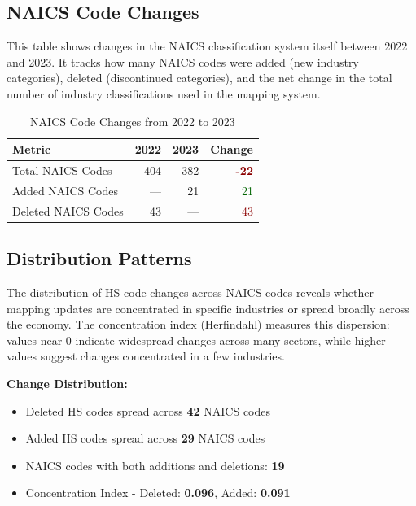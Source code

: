 \documentclass[11pt]{article}
\newcommand{\decrease}[1]{\textcolor{darkred}{\textbf{-#1}}}
\begin{document}
\subsection{NAICS Code Changes}

This table shows changes in the NAICS classification system itself between 2022 and 2023. It tracks how many NAICS codes were added (new industry categories), deleted (discontinued categories), and the net change in the total number of industry classifications used in the mapping system.

\begin{table}[H]
\centering
{}
\begin{tabular}{lrrr}
\toprule
\textbf{Metric} & \textbf{2022} & \textbf{2023} & \textbf{Change} \\
\midrule
Total NAICS Codes & 404 & 382 & \decrease{22} \\
Added NAICS Codes & --- & 21 & \textcolor{darkgreen}{21} \\
Deleted NAICS Codes & 43 & --- & \textcolor{darkred}{43} \\
\bottomrule
\end{tabular}
\caption{NAICS Code Changes from 2022 to 2023}
\end{table}

\subsection{Distribution Patterns}

The distribution of HS code changes across NAICS codes reveals whether mapping updates are concentrated in specific industries or spread broadly across the economy. The concentration index (Herfindahl) measures this dispersion: values near 0 indicate widespread changes across many sectors, while higher values suggest changes concentrated in a few industries.

\textbf{Change Distribution:}
\begin{itemize}
    \item Deleted HS codes spread across \textbf{42} NAICS codes
    \item Added HS codes spread across \textbf{29} NAICS codes
    \item NAICS codes with both additions and deletions: \textbf{19}
    \item Concentration Index - Deleted: \textbf{0.096}, Added: \textbf{0.091}
\end{itemize}
\end{document}
